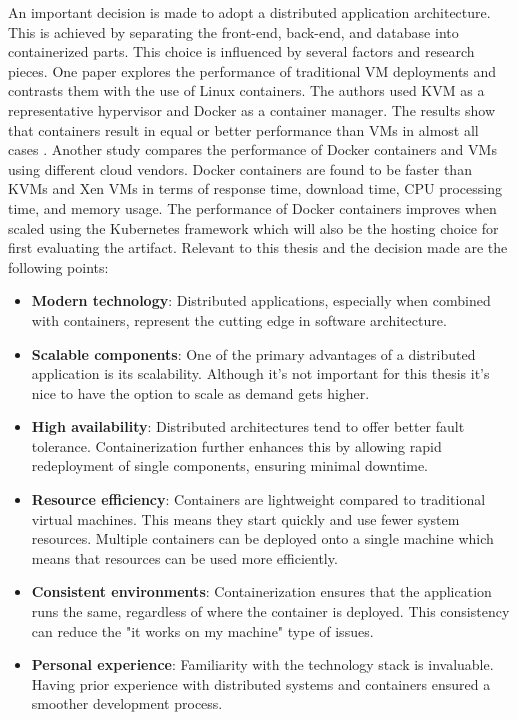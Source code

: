 An important decision is made to adopt a distributed application 
architecture. This is achieved by separating the front-end, back-end, and database into containerized parts. 
This choice is influenced by several factors and research pieces. 
One paper explores the performance of traditional VM deployments and 
contrasts them with the use of Linux containers. 
The authors used KVM as a representative hypervisor and Docker as a container manager. 
The results show that containers result in equal or better 
performance than VMs in almost all cases \parencite{felter2015updated}. 
Another study compares the performance of Docker containers and VMs using 
different cloud vendors. 
Docker containers are found to be faster than KVMs and Xen VMs in terms of response time, 
download time, CPU processing time, and memory usage. 
The performance of Docker containers improves when scaled using the 
Kubernetes framework \parencite{chengeta2021comparing} which will also be 
the hosting choice for first evaluating the artifact. 
Relevant to this thesis and the decision made are the following points:

\begin{itemize}
    \item \textbf{Modern technology}: Distributed applications, especially when combined with containers, represent the cutting edge in software architecture. 
    \item \textbf{Scalable components}: One of the primary advantages of a distributed application is its scalability. Although it's not important for this thesis it's nice to have the option to scale as demand gets higher.
    \item \textbf{High availability}: Distributed architectures tend to offer better fault tolerance. Containerization further enhances this by allowing rapid redeployment of single components, ensuring minimal downtime.
    \item \textbf{Resource efficiency}: Containers are lightweight compared to traditional virtual machines. This means they start quickly and use fewer system resources. Multiple containers can be deployed onto a single machine which means that resources can be used more efficiently.
    \item \textbf{Consistent environments}: Containerization ensures that the application runs the same, regardless of where the container is deployed. This consistency can reduce the "it works on my machine" type of issues. 
    \item \textbf{Personal experience}: Familiarity with the technology stack is invaluable. Having prior experience with distributed systems and containers ensured a smoother development process.
\end{itemize}

